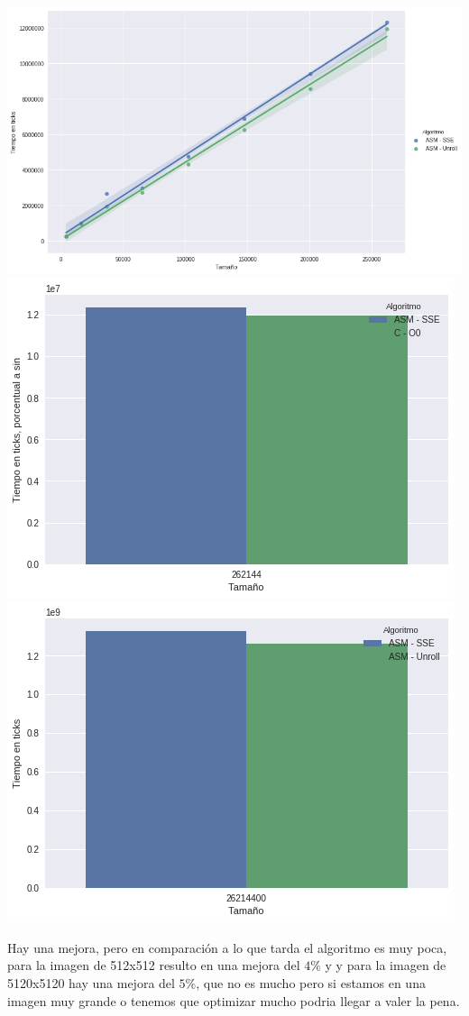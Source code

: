 \begin{center} 
	\includegraphics[scale=0.5]{img/maxCloser_Unroll_compare.png}
	\includegraphics[scale=0.5]{img/maxCloser_Unroll_small.png} %
	\includegraphics[scale=0.5]{img/maxCloser_Unroll_big.png} %
\end{center}

Hay una mejora, pero en comparación a lo que tarda el algoritmo es muy poca, para la imagen de 512x512 resulto en una mejora del $4\%$ y y para la imagen de 5120x5120 hay una mejora del $5\%$, que no es mucho pero si estamos en una imagen muy grande o tenemos que optimizar mucho podria llegar a valer la pena.